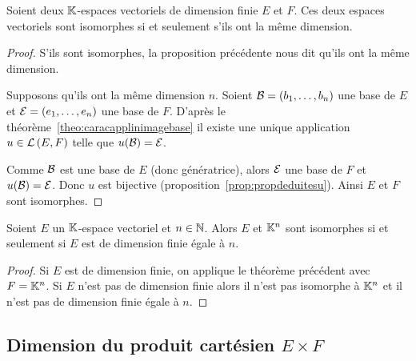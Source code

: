 \begin{theo}
  Soient deux \(\mathbb{K}\)-espaces vectoriels de dimension finie \(E\) et \(F\). Ces 
  deux espaces vectoriels sont isomorphes si et seulement s'ils ont la même 
  dimension.
\end{theo}
\begin{proof}
  S'ils sont isomorphes, la proposition précédente nous dit qu'ils ont la même 
  dimension.

  Supposons qu'ils ont la même dimension \(n\). Soient \(\mathcal{B}=(b_1, \ldots, b_n)\) 
  une base de \(E\) et \(\mathcal{E}=(e_1, \ldots, e_n)\) une base de \(F\). D'après le 
  théorème~\ref{theo:caracapplinimagebase} il existe une unique application \(u \in 
  \mathcal{L}\left(E,F\right)\) telle que \(u(\mathcal{B})=\mathcal{E}\).

  Comme \(\mathcal{B}\) est une base de \(E\) (donc génératrice), alors \(\mathcal{E}\) une base 
  de \(F\) et \(u(\mathcal{B})=\mathcal{E}\). Donc \(u\) est bijective (proposition~\ref{prop:propdeduitesu}). Ainsi \(E\) et \(F\) sont isomorphes.
\end{proof}

\begin{corth}
  Soient \(E\) un \(\mathbb{K}\)-espace vectoriel et \(n \in \mathbb{N}\). Alors \(E\) et 
  \(\mathbb{K}^n\) sont isomorphes si et seulement si \(E\) est de dimension finie égale 
  à \(n\).
\end{corth}
\begin{proof}
  Si \(E\) est de dimension finie, on applique le théorème précédent avec 
  \(F=\mathbb{K}^n\). Si \(E\) n'est pas de dimension finie alors il n'est pas isomorphe 
  à \(\mathbb{K}^n\) et il n'est pas de dimension finie égale à \(n\).
\end{proof}

\subsection{Dimension du produit cartésien \(E \times F\)}

